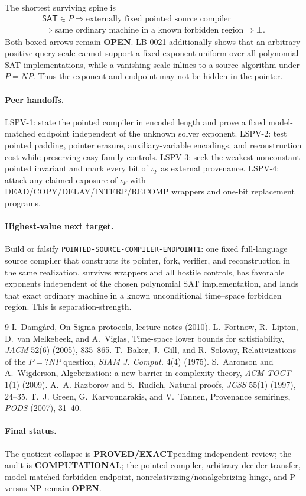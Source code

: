 \documentclass[11pt]{article}
\newcommand{\SAT}{\mathsf{SAT}}
\newcommand{\EXACT}{\textbf{PROVED/EXACT}}
\newcommand{\COMP}{\textbf{COMPUTATIONAL}}
\newcommand{\OPEN}{\textbf{OPEN}}
\begin{document}
The shortest surviving spine is
\begin{gather*}
 \SAT\in P
 \Longrightarrow
 \boxed{\text{externally fixed pointed source compiler}}\\
 \Longrightarrow
 \boxed{\text{same ordinary machine in a known forbidden region}}
 \Longrightarrow\bot .
\end{gather*}
Both boxed arrows remain \OPEN.  LB-0021 additionally shows that an arbitrary
positive query scale cannot support a fixed exponent uniform over all
polynomial SAT implementations, while a vanishing scale inlines to a source
algorithm under \(P=NP\).  Thus the exponent and endpoint may not be hidden in
the pointer.

\paragraph{Peer handoffs.}
LSPV-1: state the pointed compiler in encoded length and prove a fixed
model-matched endpoint independent of the unknown solver exponent.  LSPV-2:
test pointed padding, pointer erasure, auxiliary-variable encodings, and
reconstruction cost while preserving easy-family controls.  LSPV-3: seek the
weakest nonconstant pointed invariant and mark every bit of \(\iota_F\) as
external provenance.  LSPV-4: attack any claimed exposure of \(\iota_F\) with
DEAD/COPY/DELAY/INTERP/RECOMP wrappers and one-bit replacement programs.

\paragraph{Highest-value next target.}
Build or falsify \texttt{POINTED-SOURCE-COMPILER-ENDPOINT1}: one fixed
full-language source compiler that constructs its pointer, fork, verifier,
and reconstruction in the same realization, survives wrappers and all hostile
controls, has favorable exponents independent of the chosen polynomial SAT
implementation, and lands that exact ordinary machine in a known
unconditional time--space forbidden region.  This is separation-strength.

\begin{thebibliography}{9}
 I.~Damg\aa rd, On Sigma protocols, lecture notes (2010).
 L.~Fortnow, R.~Lipton, D.~van Melkebeek, and A.~Viglas,
Time-space lower bounds for satisfiability, \emph{JACM} 52(6) (2005), 835--865.
 T.~Baker, J.~Gill, and R.~Solovay,
Relativizations of the $P=?NP$ question, \emph{SIAM J. Comput.} 4(4) (1975).
 S.~Aaronson and A.~Wigderson,
Algebrization: a new barrier in complexity theory, \emph{ACM TOCT} 1(1) (2009).
 A.~A. Razborov and S.~Rudich,
Natural proofs, \emph{JCSS} 55(1) (1997), 24--35.
 T.~J. Green, G.~Karvounarakis, and V.~Tannen,
Provenance semirings, \emph{PODS} (2007), 31--40.
\end{thebibliography}

\paragraph{Final status.}
The quotient collapse is \EXACT pending independent review; the audit is
\COMP; the pointed compiler, arbitrary-decider transfer, model-matched
forbidden endpoint, nonrelativizing/nonalgebrizing hinge, and P versus NP
remain \OPEN.
\end{document}
